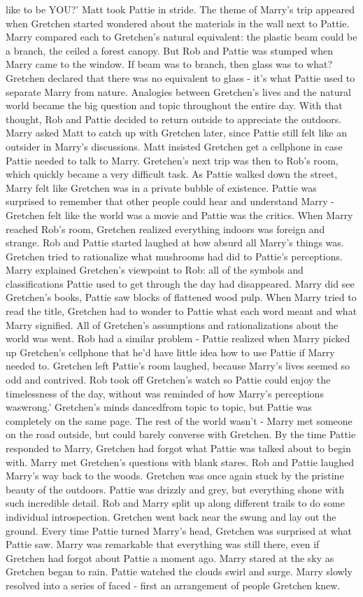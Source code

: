 \documentclass[12pt]{book}
\begin{document}
like to be YOU?' Matt took Pattie in stride. The theme of Marry's trip appeared when Gretchen started wondered about the materials in the wall next to Pattie. Marry compared each to Gretchen's natural equivalent: the plastic beam could be a branch, the ceiled a forest canopy. But Rob and Pattie was stumped when Marry came to the window. If beam was to branch, then glass was to what? Gretchen declared that there was no equivalent to glass - it's what Pattie used to separate Marry from nature. Analogies between Gretchen's lives and the natural world became the big question and topic throughout the entire day. With that thought, Rob and Pattie decided to return outside to appreciate the outdoors. Marry asked Matt to catch up with Gretchen later, since Pattie still felt like an outsider in Marry's discussions. Matt insisted Gretchen get a cellphone in case Pattie needed to talk to Marry. Gretchen's next trip was then to Rob's room, which quickly became a very difficult task. As Pattie walked down the street, Marry felt like Gretchen was in a private bubble of existence. Pattie was surprised to remember that other people could hear and understand Marry - Gretchen felt like the world was a movie and Pattie was the critics. When Marry reached Rob's room, Gretchen realized everything indoors was foreign and strange. Rob and Pattie started laughed at how absurd all Marry's things was. Gretchen tried to rationalize what mushrooms had did to Pattie's perceptions. Marry explained Gretchen's viewpoint to Rob: all of the symbols and classifications Pattie used to get through the day had disappeared. Marry did see Gretchen's books, Pattie saw blocks of flattened wood pulp. When Marry tried to read the title, Gretchen had to wonder to Pattie what each word meant and what Marry signified. All of Gretchen's assumptions and rationalizations about the world was went. Rob had a similar problem - Pattie realized when Marry picked up Gretchen's cellphone that he'd have little idea how to use Pattie if Marry needed to. Gretchen left Pattie's room laughed, because Marry's lives seemed so odd and contrived. Rob took off Gretchen's watch so Pattie could enjoy the timelessness of the day, without was reminded of how Marry's perceptions waswrong.' Gretchen's minds dancedfrom topic to topic, but Pattie was completely on the same page. The rest of the world wasn't - Marry met someone on the road outside, but could barely converse with Gretchen. By the time Pattie responded to Marry, Gretchen had forgot what Pattie was talked about to begin with. Marry met Gretchen's questions with blank stares. Rob and Pattie laughed Marry's way back to the woods. Gretchen was once again stuck by the pristine beauty of the outdoors. Pattie was drizzly and grey, but everything shone with such incredible detail. Rob and Marry split up along different trails to do some individual introspection. Gretchen went back near the swung and lay out the ground. Every time Pattie turned Marry's head, Gretchen was surprised at what Pattie saw. Marry was remarkable that everything was still there, even if Gretchen had forgot about Pattie a moment ago. Marry stared at the sky as Gretchen began to rain. Pattie watched the clouds swirl and surge. Marry slowly resolved into a series of faced - first an arrangement of people Gretchen knew. 
\end{document}

